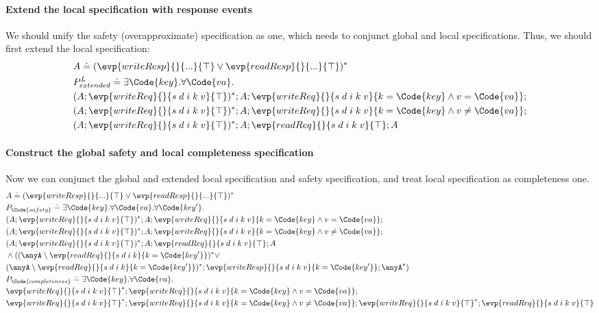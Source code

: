 \paragraph{Extend the local specification with response events} We should unify the safety (overapproximate) specification as one, which needs to conjunct global and local specifications. Thus, we should first extend the local specification:
{\small\begin{align*}
    &A \doteq (\evp{writeResp}{}{...}{\top} \lor \evp{readResp}{}{...}{\top})^*
    \\&P^{L}_{extended} \doteq \exists \Code{key}.\forall \Code{va}. 
    \\&(A;\evp{writeReq}{}{s\;d\;i\;k\;v}{\top})^*;A;\evp{writeReq}{}{s\;d\;i\;k\;v}{k = \Code{key} \land v = \Code{va}};
    \\&(A;\evp{writeReq}{}{s\;d\;i\;k\;v}{\top})^*;A;\evp{writeReq}{}{s\;d\;i\;k\;v}{k = \Code{key} \land v \not= \Code{va}};
    \\&(A;\evp{writeReq}{}{s\;d\;i\;k\;v}{\top})^*;A;\evp{readReq}{}{s\;d\;i\;k\;v}{\top};A
\end{align*}}\noindent

\paragraph{Construct the global safety and local completeness specification} Now we can conjunct the global and extended local specification and safety specification, and treat local specification as completeness one. 
{\small\begin{align*}
    &A \doteq (\evp{writeResp}{}{...}{\top} \lor \evp{readResp}{}{...}{\top})^*
    \\&P_\Code{safety} \doteq \exists \Code{key}.\forall \Code{va}.\forall \Code{key'}. 
    \\&(A;\evp{writeReq}{}{s\;d\;i\;k\;v}{\top})^*;A;\evp{writeReq}{}{s\;d\;i\;k\;v}{k = \Code{key} \land v = \Code{va}};
    \\&(A;\evp{writeReq}{}{s\;d\;i\;k\;v}{\top})^*;A;\evp{writeReq}{}{s\;d\;i\;k\;v}{k = \Code{key} \land v \not= \Code{va}};
    \\&(A;\evp{writeReq}{}{s\;d\;i\;k\;v}{\top})^*;A;\evp{readReq}{}{s\;d\;i\;k\;v}{\top};A
    \\&\land ((\anyA \setminus \evp{readReq}{}{s\;d\;i\;k}{k = \Code{key'}})^* \lor 
    \\&(\anyA \setminus \evp{readReq}{}{s\;d\;i\;k}{k = \Code{key'}})^*; \evp{writeResp}{}{s\;d\;i\;k\;v}{k = \Code{key'}};\anyA^*)
    \\&P_\Code{completeness} \doteq \exists \Code{key}.\forall \Code{va}. 
    \\&\evp{writeReq}{}{s\;d\;i\;k\;v}{\top}^*;\evp{writeReq}{}{s\;d\;i\;k\;v}{k = \Code{key} \land v = \Code{va}};
    \\&\evp{writeReq}{}{s\;d\;i\;k\;v}{\top}^*;\evp{writeReq}{}{s\;d\;i\;k\;v}{k = \Code{key} \land v \not= \Code{va}};\evp{writeReq}{}{s\;d\;i\;k\;v}{\top}^*;\evp{readReq}{}{s\;d\;i\;k\;v}{\top}
\end{align*}}\noindent

